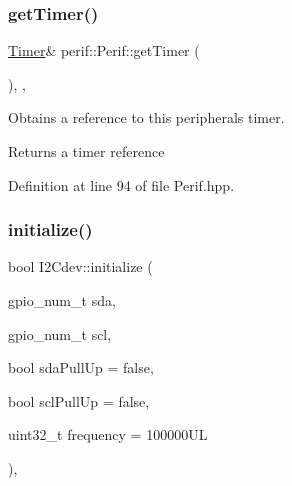 \begin{DoxyCode}{0}

\end{DoxyCode}
\mbox{\label{classperif_1_1Perif_a29c48598a861d85256c30e28af67f864}} 
\subsubsection{\texorpdfstring{getTimer()}{getTimer()}}
{\footnotesize\ttfamily \mbox{\hyperlink{classTimer}{Timer}}\& perif\+::\+Perif\+::get\+Timer (\begin{DoxyParamCaption}{ }\end{DoxyParamCaption})\hspace{0.3cm}{\ttfamily [inline]}, {\ttfamily [protected]}, {\ttfamily [inherited]}}

Obtains a reference to this peripheral\textquotesingle{}s timer.

\begin{DoxyReturn}{Returns}
a timer reference 
\end{DoxyReturn}


Definition at line 94 of file Perif.\+hpp.


\begin{DoxyCode}{0}

\end{DoxyCode}
\mbox{\label{classI2Cdev_a794a92b925f7970399f8b148caa5eef8}} 
\subsubsection{\texorpdfstring{initialize()}{initialize()}}
{\footnotesize\ttfamily bool I2\+Cdev\+::initialize (\begin{DoxyParamCaption}\item[{gpio\+\_\+num\+\_\+t}]{sda,  }\item[{gpio\+\_\+num\+\_\+t}]{scl,  }\item[{bool}]{sda\+Pull\+Up = {\ttfamily false},  }\item[{bool}]{scl\+Pull\+Up = {\ttfamily false},  }\item[{uint32\+\_\+t}]{frequency = {\ttfamily 100000UL} }\end{DoxyParamCaption})\hspace{0.3cm}{\ttfamily [protected]}, {\ttfamily [inherited]}}

